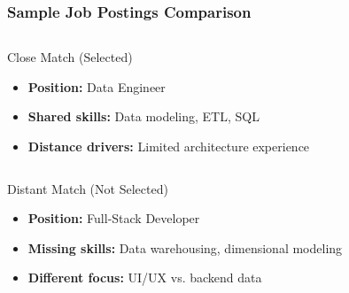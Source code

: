 \documentclass[aspectratio=169]{beamer}
\begin{document}
\begin{frame}
\frametitle{Sample Job Postings Comparison}

\begin{comparison}
\begin{column}{0.48\textwidth}
\begin{block}{Close Match (Selected)}
\begin{itemize}
\item \textbf{Position:} Data Engineer
\item \textbf{Shared skills:} Data modeling, ETL, SQL
\item \textbf{Distance drivers:} Limited architecture experience
\end{itemize}
\end{block}
\end{column}

\begin{column}{0.48\textwidth}
\begin{block}{Distant Match (Not Selected)}
\begin{itemize}
\item \textbf{Position:} Full-Stack Developer
\item \textbf{Missing skills:} Data warehousing, dimensional modeling
\item \textbf{Different focus:} UI/UX vs. backend data
\end{itemize}
\end{block}
\end{column}
\end{comparison}

\centering
{}
\end{frame}
\end{document}
